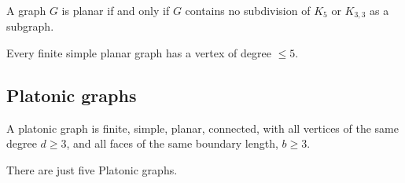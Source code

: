 \documentclass[10pt, a4paper]{article}
\begin{document}
\begin{theorem}
    A graph $G$ is planar if and only if $G$ contains no subdivision of $K_5$ or $K_{3, 3}$ as a subgraph.
\end{theorem}

\begin{theorem}
    Every finite simple planar graph has a vertex of degree $\leq 5$.
\end{theorem}

\subsection{Platonic graphs}

\begin{definition}
    A platonic graph is finite,
    simple,
    planar,
    connected,
    with all vertices of the same degree $d \geq 3$,
    and all faces of the same boundary length,
    $b \geq 3$.
\end{definition}

\begin{theorem}
    There are just five Platonic graphs.
\end{theorem}
\end{document}
